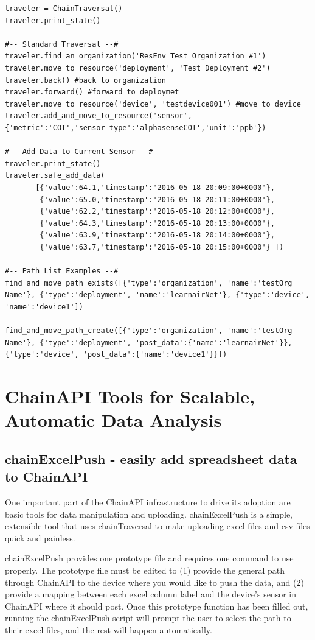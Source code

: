 \begin{lstlisting}[style=code]
traveler = ChainTraversal()
traveler.print_state()

#-- Standard Traversal --#
traveler.find_an_organization('ResEnv Test Organization #1')
traveler.move_to_resource('deployment', 'Test Deployment #2')
traveler.back() #back to organization
traveler.forward() #forward to deploymet
traveler.move_to_resource('device', 'testdevice001') #move to device
traveler.add_and_move_to_resource('sensor', {'metric':'COT','sensor_type':'alphasenseCOT','unit':'ppb'})
    
#-- Add Data to Current Sensor --#
traveler.print_state()
traveler.safe_add_data(
       [{'value':64.1,'timestamp':'2016-05-18 20:09:00+0000'},
        {'value':65.0,'timestamp':'2016-05-18 20:11:00+0000'},
        {'value':62.2,'timestamp':'2016-05-18 20:12:00+0000'},
        {'value':64.3,'timestamp':'2016-05-18 20:13:00+0000'},
        {'value':63.9,'timestamp':'2016-05-18 20:14:00+0000'},
        {'value':63.7,'timestamp':'2016-05-18 20:15:00+0000'} ])

#-- Path List Examples --#
find_and_move_path_exists([{'type':'organization', 'name':'testOrg Name'}, {'type':'deployment', 'name':'learnairNet'}, {'type':'device', 'name':'device1'])

find_and_move_path_create([{'type':'organization', 'name':'testOrg Name'}, {'type':'deployment', 'post_data':{'name':'learnairNet'}}, {'type':'device', 'post_data':{'name':'device1'}}])
\end{lstlisting}


\section{ChainAPI Tools for Scalable, Automatic Data Analysis}  

\subsection{chainExcelPush - easily add spreadsheet data to ChainAPI}

One important part of the ChainAPI infrastructure to drive its adoption are basic tools for data manipulation and uploading.  chainExcelPush is a simple, extensible tool that uses chainTraversal to make uploading excel files and csv files quick and painless.

chainExcelPush provides one prototype file and requires one command to use properly.  The prototype file must be edited to (1) provide the general path through ChainAPI to the device where you would like to push the data, and (2) provide a mapping between each excel column label and the device's sensor in ChainAPI where it should post.  Once this prototype function has been filled out, running the chainExcelPush script will prompt the user to select the path to their excel files, and the rest will happen automatically.

